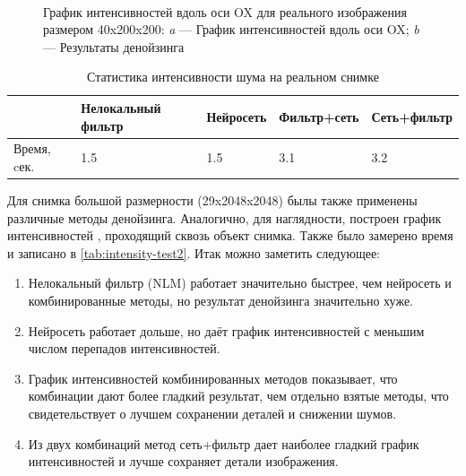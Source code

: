 \begin{figure}[H]
\begin{subfigure}[t]{0.3\textwidth\relax}
	\end{subfigure}
	\\[20pt]
	\captionsetup{justification=centering} %
	\caption{График интенсивностей вдоль оси OX для реального изображения размером 40x200x200: {\itshape a} --- График интенсивностей вдоль оси OX; {\itshape b} --- Результаты денойзинга} 
	\label{fig:intensity-test1}
\end{figure}
\begin{table} [H]%
	\centering\small
	\caption{Статистика интенсивности шума на реальном снимке}%
	\label{tab:intensity-test1}		
	\begin{tabular}{|l|l|l|l|l|}
		\hline
		 &Нелокальный фильтр&Нейросеть&Фильтр+сеть&Сеть+фильтр\\
		\hline	
		Время, cек.
		&1.5&1.5&3.1&3.2\\ \hline
	\end{tabular}
	\normalsize%
\end{table}
\par Для снимка большой размерности (29x2048x2048) былы также применены различные методы денойзинга. Аналогично, для наглядности, построен график интенсивностей , проходящий сквозь объект снимка. Также было замерено время и записано в \ref{tab:intensity-test2}. Итак можно заметить следующее: 
\begin{enumerate}[]
	\item  Нелокальный фильтр (NLM) работает значительно быстрее, чем нейросеть и комбинированные методы, но результат денойзинга значительно хуже.
	\item Нейросеть работает дольше, но даёт график интенсивностей с меньшим числом перепадов интенсивностей.
	\item График интенсивностей комбинированных методов показывает, что комбинации дают более гладкий результат, чем отдельно взятые методы, что свидетельствует о лучшем сохранении деталей и снижении шумов.
	\item Из двух комбинаций метод сеть+фильтр дает наиболее гладкий график интенсивностей и лучше сохраняет детали изображения.
\end{enumerate}
